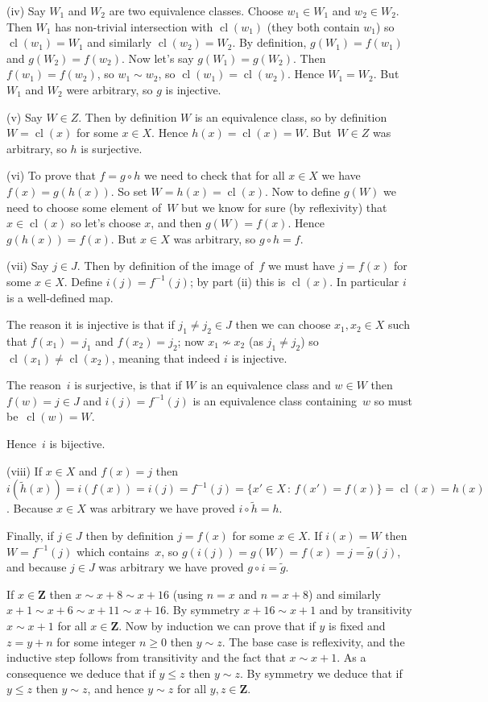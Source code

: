 \documentclass[10pt]{article}
\DeclareMathOperator{\cl}{cl}
\newcommand{\Z}{\mathbf{Z}}
\begin{document}
(iv) Say $W_1$ and $W_2$ are two equivalence classes. Choose $w_1\in W_1$ and $w_2\in W_2$. Then $W_1$ has non-trivial intersection with $\cl(w_1)$ (they both contain $w_1$) so $\cl(w_1)=W_1$ and similarly $\cl(w_2)=W_2$. By definition, $g(W_1)=f(w_1)$ and $g(W_2)=f(w_2)$. Now let's say $g(W_1)=g(W_2)$. Then $f(w_1)=f(w_2)$, so $w_1\sim w_2$, so $\cl(w_1)=\cl(w_2)$. Hence $W_1=W_2$. But $W_1$ and $W_2$ were arbitrary, so $g$ is injective.

(v) Say $W\in Z$. Then by definition $W$ is an equivalence class, so by definition $W=\cl(x)$ for some $x\in X$. Hence $h(x)=\cl(x)=W$. But~$W\in Z$ was arbitrary, so $h$ is surjective.

(vi) To prove that $f=g\circ h$ we need to check that for all $x\in X$ we have $f(x)=g(h(x))$. So set $W=h(x)=\cl(x)$. Now to define $g(W)$ we need to choose some element of~$W$ but we know for sure (by reflexivity) that $x\in\cl(x)$ so let's choose $x$, and then $g(W)=f(x)$. Hence $g(h(x))=f(x)$. But $x\in X$ was arbitrary, so $g\circ h=f$.

(vii) Say $j\in J$. Then by definition of the image of~$f$ we must have $j=f(x)$ for some $x\in X$. Define $i(j)=f^{-1}(j)$; by part (ii) this is $\cl(x)$. In particular $i$ is a well-defined map. 

The reason it is injective is that if $j_1\not=j_2\in J$ then we can choose $x_1,x_2\in X$ such that $f(x_1)=j_1$ and $f(x_2)=j_2$; now $x_1\not\sim x_2$ (as $j_1\not=j_2$) so $\cl(x_1)\not=\cl(x_2)$, meaning that indeed $i$ is injective.

The reason~$i$ is surjective, is that if $W$ is an equivalence class and $w\in W$ then $f(w)=j\in J$ and $i(j)=f^{-1}(j)$ is an equivalence class containing~$w$ so must be~$\cl(w)=W$.

Hence~$i$ is bijective.

(viii) If $x\in X$ and $f(x)=j$ then $i(\tilde{h}(x))=i(f(x))=i(j)=f^{-1}(j)=\{x'\in X\,:\,f(x')=f(x)\}=\cl(x)=h(x)$. Because $x\in X$ was arbitrary we have proved $i\circ\tilde{h}=h$.

Finally, if $j\in J$ then by definition $j=f(x)$ for some $x\in X$. If $i(x)=W$ then $W=f^{-1}(j)$ which contains~$x$, so $g(i(j))=g(W)=f(x)=j=\tilde{g}(j)$, and because $j\in J$ was arbitrary we have proved $g\circ i=\tilde{g}$.

\medskip{} If $x\in\Z$ then $x\sim x+8\sim x+16$ (using $n=x$ and $n=x+8$) and similarly $x+1\sim x+6\sim x+11\sim x+16$. By symmetry $x+16\sim x+1$ and by transitivity $x\sim x+1$ for all $x\in\Z$. Now by induction we can prove that if $y$ is fixed and $z=y+n$ for some integer $n\geq0$ then $y\sim z$. The base case is reflexivity, and the inductive step follows from transitivity and the fact that $x\sim x+1$. As a consequence we deduce that if $y\leq z$ then $y\sim z$. By symmetry we deduce that if $y\leq z$ then $y\sim z$, and hence $y\sim z$ for all $y,z\in\Z$.
\end{document}

